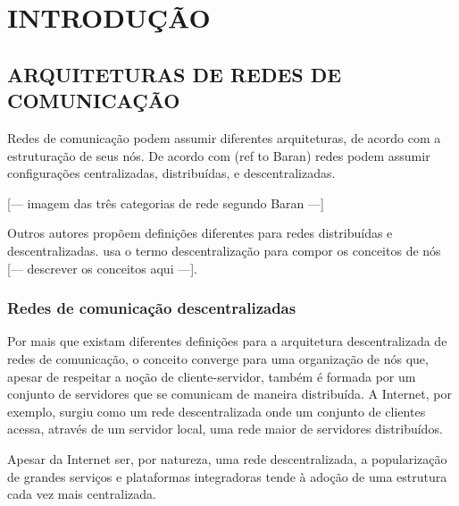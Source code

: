 \chapter{INTRODUÇÃO}


\section{ARQUITETURAS DE REDES DE COMUNICAÇÃO}


Redes de comunicação podem assumir diferentes arquiteturas, de acordo com a 
estruturação de seus nós. De acordo com (ref to Baran) redes podem assumir
configurações centralizadas, distribuídas, e descentralizadas. 

[--- imagem das três categorias de rede segundo Baran ---]

Outros autores propõem definições diferentes para redes distribuídas e
descentralizadas. usa o termo descentralização para compor os
conceitos de nós [--- descrever os conceitos aqui ---]. 


\subsection{Redes de comunicação descentralizadas}

Por mais que existam diferentes definições para a arquitetura descentralizada de
redes de comunicação, o conceito converge para uma organização de nós que, apesar
de respeitar a noção de cliente-servidor, também é formada por um conjunto de
servidores que se comunicam de maneira distribuída. A Internet, por exemplo, surgiu
como um rede descentralizada onde um conjunto de clientes acessa, através de um
servidor local, uma rede maior de servidores distribuídos.

Apesar da Internet ser, por natureza, uma rede descentralizada, a popularização de 
grandes serviços e plataformas integradoras tende à adoção de uma estrutura  cada
vez mais centralizada. %




